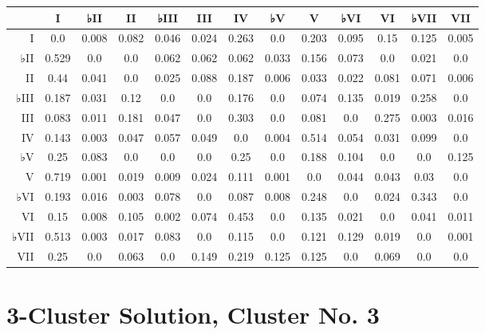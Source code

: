 \begin{table}[htbp]
\begin{minipage}{\linewidth}
\setlength{\tymax}{0.5\linewidth}
\centering
\small
\begin{tabulary}{\textwidth}{@{}RCCCCCCCCCCCC@{}} \toprule
&I&♭II&II&♭III&III&IV&♭V&V&♭VI&VI&♭VII&VII\\
\midrule
I&0.0&0.008&0.082&0.046&0.024&0.263&0.0&0.203&0.095&0.15&0.125&0.005\\
♭II&0.529&0.0&0.0&0.062&0.062&0.062&0.033&0.156&0.073&0.0&0.021&0.0\\
II&0.44&0.041&0.0&0.025&0.088&0.187&0.006&0.033&0.022&0.081&0.071&0.006\\
♭III&0.187&0.031&0.12&0.0&0.0&0.176&0.0&0.074&0.135&0.019&0.258&0.0\\
III&0.083&0.011&0.181&0.047&0.0&0.303&0.0&0.081&0.0&0.275&0.003&0.016\\
IV&0.143&0.003&0.047&0.057&0.049&0.0&0.004&0.514&0.054&0.031&0.099&0.0\\
♭V&0.25&0.083&0.0&0.0&0.0&0.25&0.0&0.188&0.104&0.0&0.0&0.125\\
V&0.719&0.001&0.019&0.009&0.024&0.111&0.001&0.0&0.044&0.043&0.03&0.0\\
♭VI&0.193&0.016&0.003&0.078&0.0&0.087&0.008&0.248&0.0&0.024&0.343&0.0\\
VI&0.15&0.008&0.105&0.002&0.074&0.453&0.0&0.135&0.021&0.0&0.041&0.011\\
♭VII&0.513&0.003&0.017&0.083&0.0&0.115&0.0&0.121&0.129&0.019&0.0&0.001\\
VII&0.25&0.0&0.063&0.0&0.149&0.219&0.125&0.125&0.0&0.069&0.0&0.0\\

\bottomrule

\end{tabulary}
\end{minipage}
\end{table}

\section{3-Cluster Solution, Cluster No. 3}
\label{3-clustersolutionclusterno.3}

